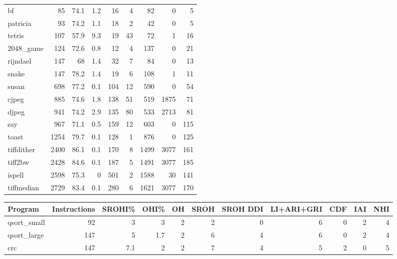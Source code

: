 \begin{tabular}{lrrrrrrrr}
 bf              &       85 &     74.1 &    1.2 &   16 &    4 &     82 &     0 &     5 \\
 patricia        &       93 &     74.2 &    1.1 &   18 &    2 &     42 &     0 &     5 \\
 tetris          &      107 &     57.9 &    9.3 &   19 &   43 &     72 &     1 &    16 \\
 2048\_game       &      124 &     72.6 &    0.8 &   12 &    4 &    137 &     0 &    21 \\
 rijndael        &      147 &     68   &    1.4 &   32 &    7 &     84 &     0 &    13 \\
 snake           &      147 &     78.2 &    1.4 &   19 &    6 &    108 &     1 &    11 \\
 susan           &      698 &     77.2 &    0.1 &  104 &   12 &    590 &     0 &    54 \\
 cjpeg           &      885 &     74.6 &    1.8 &  138 &   51 &    519 &  1875 &    71 \\
 djpeg           &      941 &     74.2 &    2.9 &  135 &   80 &    533 &  2713 &    81 \\
 say             &      967 &     71.1 &    0.5 &  159 &   12 &    603 &     0 &   115 \\
 toast           &     1254 &     79.7 &    0.1 &  128 &    1 &    876 &     0 &   125 \\
 tiffdither      &     2400 &     86.1 &    0.1 &  170 &    8 &   1499 &  3077 &   161 \\
 tiff2bw         &     2428 &     84.6 &    0.1 &  187 &    5 &   1491 &  3077 &   185 \\
 ispell          &     2598 &     75.3 &    0   &  501 &    2 &   1588 &    30 &   141 \\
 tiffmedian      &     2729 &     83.4 &    0.1 &  280 &    6 &   1621 &  3077 &   170 \\
\hline
\end{tabular}\begin{tabular}{lrrrrrrrrrr}
\hline
 Program         &   Instructions &   SROHI\% &   OHI\% &   OH &   SROH &   SROH DDI &   LI+ARI+GRI &   CDF &   IAI &   NHI \\
\hline
 qsort\_small     &             92 &      3   &    3   &    2 &      2 &          0 &            6 &     0 &     2 &     4 \\
 qsort\_large     &            147 &      5   &    1.7 &    2 &      6 &          4 &            6 &     0 &     2 &     4 \\
 crc             &            147 &      7.1 &    2   &    2 &      7 &          4 &            5 &     2 &     0 &     5 \\

\end{tabular}
